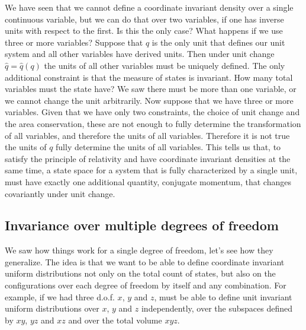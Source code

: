 We have seen that we cannot define a coordinate invariant density over a single continuous variable, but we can do that over two variables, if one has inverse units with respect to the first. Is this the only case? What happens if we use three or more variables? Suppose that $q$ is the only unit that defines our unit system and all other variables have derived units. Then under unit change $\hat{q} = \hat{q}(q)$ the units of all other variables must be uniquely defined. The only additional constraint is that the measure of states is invariant. How many total variables must the state have? We saw there must be more than one variable, or we cannot change the unit arbitrarily. Now suppose that we have three or more variables. Given that we have only two constraints, the choice of unit change and the area conservation, these are not enough to fully determine the transformation of all variables, and therefore the units of all variables. Therefore it is not true the units of $q$ fully determine the units of all variables. This tells us that, to satisfy the principle of relativity and have coordinate invariant densities at the same time, a state space for a system that is fully characterized by a single unit, must have exactly one additional quantity, conjugate momentum, that changes covariantly under unit change.

\subsection{Invariance over multiple degrees of freedom}

We saw how things work for a single degree of freedom, let's see how they generalize. The idea is that we want to be able to define coordinate invariant uniform distributions not only on the total count of states, but also on the configurations over each degree of freedom by itself and any combination. For example, if we had three d.o.f. $x$, $y$ and $z$, must be able to define unit invariant uniform distributions over $x$, $y$ and $z$ independently, over the subspaces defined by $xy$, $yz$ and $xz$ and over the total volume $xyz$.


